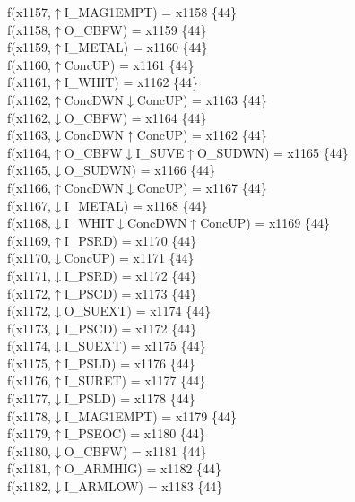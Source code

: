 f(x1157,$\uparrow$I\_MAG1EMPT) = x1158 \{44\} \\  
f(x1158,$\uparrow$O\_CBFW) = x1159 \{44\} \\  
f(x1159,$\uparrow$I\_METAL) = x1160 \{44\} \\  
f(x1160,$\uparrow$ConcUP) = x1161 \{44\} \\  
f(x1161,$\uparrow$I\_WHIT) = x1162 \{44\} \\  
f(x1162,$\uparrow$ConcDWN$\downarrow$ConcUP) = x1163 \{44\} \\  
f(x1162,$\downarrow$O\_CBFW) = x1164 \{44\} \\  
f(x1163,$\downarrow$ConcDWN$\uparrow$ConcUP) = x1162 \{44\} \\  
f(x1164,$\uparrow$O\_CBFW$\downarrow$I\_SUVE$\uparrow$O\_SUDWN) = x1165 \{44\} \\  
f(x1165,$\downarrow$O\_SUDWN) = x1166 \{44\} \\  
f(x1166,$\uparrow$ConcDWN$\downarrow$ConcUP) = x1167 \{44\} \\  
f(x1167,$\downarrow$I\_METAL) = x1168 \{44\} \\  
f(x1168,$\downarrow$I\_WHIT$\downarrow$ConcDWN$\uparrow$ConcUP) = x1169 \{44\} \\  
f(x1169,$\uparrow$I\_PSRD) = x1170 \{44\} \\  
f(x1170,$\downarrow$ConcUP) = x1171 \{44\} \\  
f(x1171,$\downarrow$I\_PSRD) = x1172 \{44\} \\  
f(x1172,$\uparrow$I\_PSCD) = x1173 \{44\} \\  
f(x1172,$\downarrow$O\_SUEXT) = x1174 \{44\} \\  
f(x1173,$\downarrow$I\_PSCD) = x1172 \{44\} \\  
f(x1174,$\downarrow$I\_SUEXT) = x1175 \{44\} \\  
f(x1175,$\uparrow$I\_PSLD) = x1176 \{44\} \\  
f(x1176,$\uparrow$I\_SURET) = x1177 \{44\} \\  
f(x1177,$\downarrow$I\_PSLD) = x1178 \{44\} \\  
f(x1178,$\downarrow$I\_MAG1EMPT) = x1179 \{44\} \\  
f(x1179,$\uparrow$I\_PSEOC) = x1180 \{44\} \\  
f(x1180,$\downarrow$O\_CBFW) = x1181 \{44\} \\  
f(x1181,$\uparrow$O\_ARMHIG) = x1182 \{44\} \\  
f(x1182,$\downarrow$I\_ARMLOW) = x1183 \{44\} \\  
